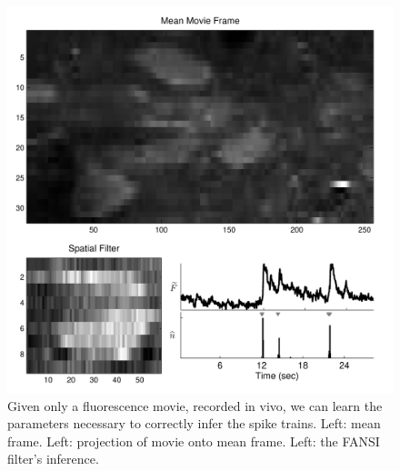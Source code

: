 
\begin{figure}[H]
\centering \includegraphics[width=.9\linewidth]{../figs/spatial_data}
\caption{Given only a fluorescence movie, recorded in vivo, we can learn the parameters necessary to correctly infer the spike trains. Left: mean frame.  Left: projection of movie onto mean frame. Left: the FANSI filter's inference.} \label{fig:spatial_data}
\end{figure}




